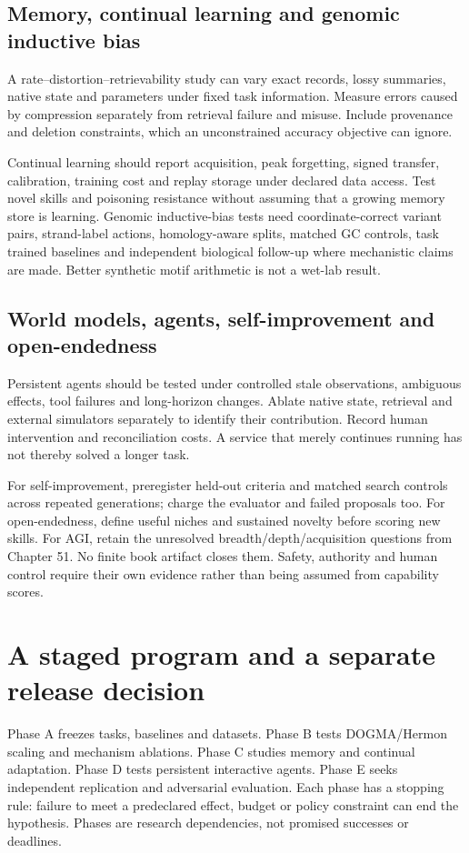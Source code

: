 \subsection{Memory, continual learning and genomic inductive bias}
A rate--distortion--retrievability study can vary exact records, lossy summaries,
native state and parameters under fixed task information. Measure errors caused
by compression separately from retrieval failure and misuse. Include provenance
and deletion constraints, which an unconstrained accuracy objective can ignore.

Continual learning should report acquisition, peak forgetting, signed transfer,
calibration, training cost and replay storage under declared data access. Test
novel skills and poisoning resistance without assuming that a growing memory
store is learning. Genomic inductive-bias tests need coordinate-correct variant
pairs, strand-label actions, homology-aware splits, matched GC controls, task
trained baselines and independent biological follow-up where mechanistic claims
are made. Better synthetic motif arithmetic is not a wet-lab result.

\subsection{World models, agents, self-improvement and open-endedness}
Persistent agents should be tested under controlled stale observations,
ambiguous effects, tool failures and long-horizon changes. Ablate native state,
retrieval and external simulators separately to identify their contribution.
Record human intervention and reconciliation costs. A service that merely
continues running has not thereby solved a longer task.

For self-improvement, preregister held-out criteria and matched search controls
across repeated generations; charge the evaluator and failed proposals too.
For open-endedness, define useful niches and sustained novelty before scoring
new skills. For AGI, retain the unresolved breadth/depth/acquisition questions
from Chapter 51. No finite book artifact closes them. Safety, authority and
human control require their own evidence rather than being assumed from
capability scores.

\section{A staged program and a separate release decision}
Phase A freezes tasks, baselines and datasets. Phase B tests DOGMA/Hermon scaling
and mechanism ablations. Phase C studies memory and continual adaptation.
Phase D tests persistent interactive agents. Phase E seeks independent
replication and adversarial evaluation. Each phase has a stopping rule: failure
to meet a predeclared effect, budget or policy constraint can end the hypothesis.
Phases are research dependencies, not promised successes or deadlines.

